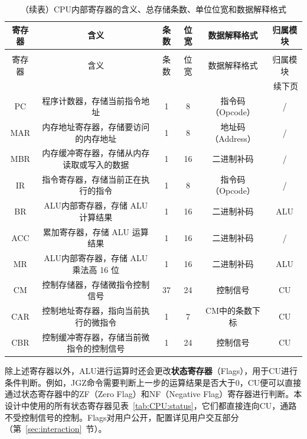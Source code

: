 \documentclass[lang=cn,a4paper,newtx]{elegantpaper}
\begin{document}
\begin{longtable}{c c c c c c}
  \caption{CPU内部寄存器的含义、总存储条数、单位位宽和数据解释格式} \label{tab:CPU:datawidth} \\
  \toprule
  寄存器 & 含义 & 条数 & 位宽 & 数据解释格式 & 归属模块\\
  \midrule
  \endfirsthead

  \caption[]{（续表）CPU内部寄存器的含义、总存储条数、单位位宽和数据解释格式} \\
  \toprule
  寄存器 & 含义 & 条数 & 位宽 & 数据解释格式 & 归属模块\\
  \midrule
  \endhead

  \midrule
  \multicolumn{6}{r}{续下页} \\
  \midrule
  \endfoot

  \bottomrule
  \endlastfoot

  PC   & 程序计数器，存储当前指令地址             & 1  & 8   & 指令码（Opcode） & /\\
  MAR  & 内存地址寄存器，存储要访问的内存地址     & 1  & 8   & 地址码（Address）& /\\
  MBR  & 内存缓冲寄存器，存储从内存读取或写入的数据 & 1  & 16  & 二进制补码 & /\\
  IR   & 指令寄存器，存储当前正在执行的指令       & 1  & 8   & 指令码（Opcode）& /\\
  BR   & ALU内部寄存器，存储 ALU 计算结果        & 1  & 16  & 二进制补码 & ALU\\
  ACC  & 累加寄存器，存储 ALU 运算结果           & 1  & 16  & 二进制补码 & /\\
  MR   & ALU内部寄存器，存储 ALU 乘法高 16 位       & 1  & 16  & 二进制补码 & ALU\\
  CM   & 控制存储器，存储微指令控制信号         & 37 & 24  & 控制信号 & CU\\
  CAR  & 控制地址寄存器，指向当前执行的微指令   & 1  & 7   & CM中的条数下标 & CU\\
  CBR  & 控制缓冲寄存器，存储当前微指令的控制信号 & 1  & 24  & 控制信号 & CU\\
\end{longtable}

除上述寄存器以外，ALU进行运算时还会更改\textbf{状态寄存器}（Flags），用于CU进行条件判断。例如，JGZ命令需要判断上一步的运算结果是否大于0，CU便可以直接通过状态寄存器中的ZF（Zero Flag）和NF（Negative Flag）寄存器进行判断。本设计中使用的所有状态寄存器见表~\ref{tab:CPU:status}，它们都直接连向CU，通路不受控制信号的控制。Flags对用户公开，配置详见用户交互部分（第~\ref{sec:interaction}~节）。
\end{document}
